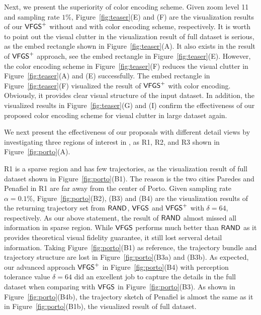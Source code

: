 Next, we present the superiority of color encoding scheme.
Given zoom level 11 and sampling rate $1\%$, Figure~\ref{fig:teaser}(E) and (F) are the visualization results of our $\mathsf{VFGS}^{+}$ without and with color encoding scheme, respectively.
It is worth to point out the visual clutter in the visualization result of full dataset is serious, as the embed rectangle shown in Figure~\ref{fig:teaser}(A).
It also exists in the result of $\mathsf{VFGS}^{+}$ approach, see the embed rectangle in Figure~\ref{fig:teaser}(E).
However, the color encoding scheme in Figure~\ref{fig:teaser}(F) reduces the visual clutter in Figure~\ref{fig:teaser}(A) and (E) successfully.
The embed rectangle in Figure~\ref{fig:teaser}(F) visualized the result of $\mathsf{VFGS}^{+}$ with color encoding.
Obviously, it provides clear visual structure of the input dataset.
In addition, the visualized results in Figure~\ref{fig:teaser}(G) and (I) confirm the effectiveness of our proposed color encoding scheme for visual clutter in large dataset again.

We next present the effectiveness of our proposals with different detail views by investigating three regions of interest in \pt{}, as R1, R2, and R3 shown in Figure~\ref{fig:porto}(A).

R1 is a sparse region and has few trajectories, as the visualization result of full \pt{} dataset shown in Figure~\ref{fig:porto}(B1).
The reason is the two cities Paredes and Penafiel in R1 are far away from the center of Porto.
Given sampling rate $\alpha=0.1\%$, Figure~\ref{fig:porto}(B2), (B3) and (B4) are the visualization results of the returning trajectory set from $\mathsf{RAND}{}$, $\mathsf{VFGS}$ and $\mathsf{VFGS}^{+}$ with $\delta=64$, respectively.
As our above statement, the result of $\mathsf{RAND}$ almost missed all information in sparse region.
While $\mathsf{VFGS}$ performs much better than $\mathsf{RAND}$ as it provides theoretical visual fidelity guarantee, it still lost serveral detail information.
Taking Figure~\ref{fig:porto}(B1) as reference, the trajectory bundle and trajectory structure are lost in Figure~\ref{fig:porto}(B3a) and (B3b).
As expected, our advanced approach $\mathsf{VFGS}^{+}$ in Figure~\ref{fig:porto}(B4) with perception tolerance value $\delta=64$ did an excellent job to capture the details in the full dataset when comparing with $\mathsf{VFGS}$ in Figure~\ref{fig:porto}(B3).
As shown in Figure~\ref{fig:porto}(B4b), the trajectory sketch of Penafiel is almost the same as it in Figure~\ref{fig:porto}(B1b), the visualized result of full dataset.


